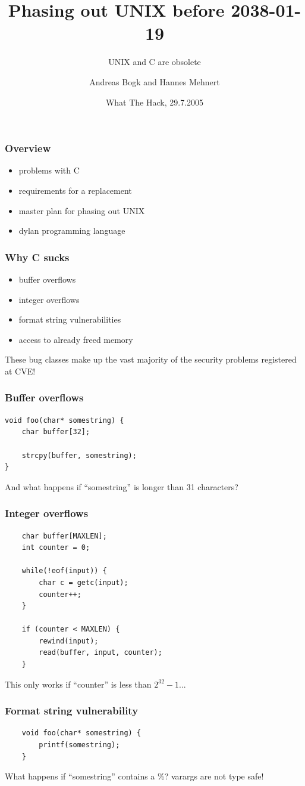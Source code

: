 \documentclass[compress]{beamer}
\title{Phasing out UNIX before 2038-01-19}
\subtitle{UNIX and C are obsolete}
\author{Andreas Bogk and Hannes Mehnert}
\begin{document}
\date{What The Hack, 29.7.2005}
\frame{\titlepage}

\begin{frame}
  \frametitle{Overview}
  \begin{itemize}
  \item problems with C
  \item requirements for a replacement
  \item master plan for phasing out UNIX
  \item dylan programming language
  \end{itemize}
\end{frame}

\begin{frame}
  \frametitle{Why C sucks}
  \begin{itemize}
  \item buffer overflows
  \item integer overflows
  \item format string vulnerabilities
  \item access to already freed memory
  \end{itemize}
  These bug classes make up the vast majority of the security problems registered at CVE!
\end{frame}

\begin{frame}[fragile]
  \frametitle{Buffer overflows}
  \begin{verbatim}
void foo(char* somestring) {
    char buffer[32];

    strcpy(buffer, somestring);
}
  \end{verbatim}
  And what happens if ``somestring'' is longer than 31 characters?
\end{frame}

\begin{frame}[fragile]
  \frametitle{Integer overflows}
  \begin{verbatim}
    char buffer[MAXLEN];
    int counter = 0;

    while(!eof(input)) {
        char c = getc(input);
        counter++;
    }

    if (counter < MAXLEN) {
        rewind(input);
        read(buffer, input, counter);
    }
  \end{verbatim}
  This only works if ``counter'' is less than $2 ^ {32} - 1$...
\end{frame}

\begin{frame}[fragile]
  \frametitle{Format string vulnerability}
  \begin{verbatim}
    void foo(char* somestring) {
        printf(somestring);
    }
  \end{verbatim}
  What happens if ``somestring'' contains a \%? varargs are not type safe!
\end{frame}
\end{document}

